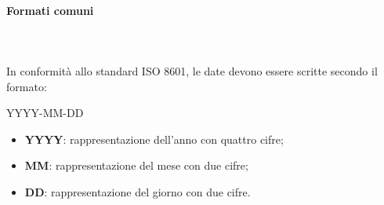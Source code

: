 		\paragraph{Formati comuni} \mbox{}\\ \mbox{}\\
		In conformità allo standard ISO 8601, le date devono essere scritte secondo il formato: \newline \newline
		\centerline{YYYY-MM-DD}
		\begin{itemize}
			\item \textbf{YYYY}: rappresentazione dell'anno con quattro cifre;
			\item\textbf{MM}: rappresentazione del mese con due cifre;
			\item \textbf{DD}: rappresentazione del giorno con due cifre.			
		\end{itemize}
